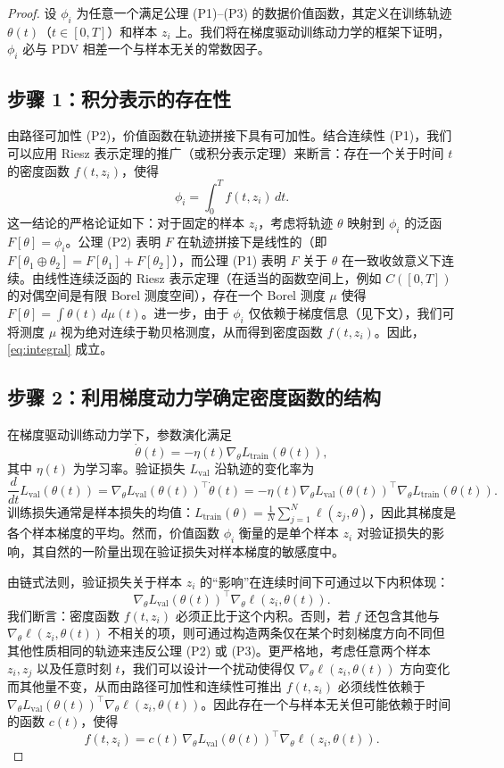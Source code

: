 \begin{proof}
设 $\phi_i$ 为任意一个满足公理 (P1)--(P3) 的数据价值函数，其定义在训练轨迹 $\theta(t)$（$t\in[0,T]$）和样本 $z_i$ 上。我们将在梯度驱动训练动力学的框架下证明，$\phi_i$ 必与 PDV 相差一个与样本无关的常数因子。

\subsection*{步骤 1：积分表示的存在性}
由路径可加性 (P2)，价值函数在轨迹拼接下具有可加性。结合连续性 (P1)，我们可以应用 Riesz 表示定理的推广（或积分表示定理）来断言：存在一个关于时间 $t$ 的密度函数 $f(t,z_i)$，使得
\begin{equation}
\phi_i = \int_0^T f(t, z_i) \, dt.
\label{eq:integral}
\end{equation}
这一结论的严格论证如下：对于固定的样本 $z_i$，考虑将轨迹 $\theta$ 映射到 $\phi_i$ 的泛函 $F[\theta] = \phi_i$。公理 (P2) 表明 $F$ 在轨迹拼接下是线性的（即 $F[\theta_1 \oplus \theta_2] = F[\theta_1] + F[\theta_2]$），而公理 (P1) 表明 $F$ 关于 $\theta$ 在一致收敛意义下连续。由线性连续泛函的 Riesz 表示定理（在适当的函数空间上，例如 $C([0,T])$ 的对偶空间是有限 Borel 测度空间），存在一个 Borel 测度 $\mu$ 使得 $F[\theta] = \int \theta(t) \, d\mu(t)$。进一步，由于 $\phi_i$ 仅依赖于梯度信息（见下文），我们可将测度 $\mu$ 视为绝对连续于勒贝格测度，从而得到密度函数 $f(t,z_i)$。因此，\eqref{eq:integral} 成立。

\subsection*{步骤 2：利用梯度动力学确定密度函数的结构}
在梯度驱动训练动力学下，参数演化满足
\[
\dot{\theta}(t) = -\eta(t) \nabla_\theta L_{\text{train}}(\theta(t)),
\]
其中 $\eta(t)$ 为学习率。验证损失 $L_{\text{val}}$ 沿轨迹的变化率为
\[
\frac{d}{dt} L_{\text{val}}(\theta(t)) = \nabla_\theta L_{\text{val}}(\theta(t))^\top \dot{\theta}(t)
= -\eta(t) \nabla_\theta L_{\text{val}}(\theta(t))^\top \nabla_\theta L_{\text{train}}(\theta(t)).
\]
训练损失通常是样本损失的均值：$L_{\text{train}}(\theta) = \frac{1}{N} \sum_{j=1}^N \ell(z_j,\theta)$，因此其梯度是各个样本梯度的平均。然而，价值函数 $\phi_i$ 衡量的是单个样本 $z_i$ 对验证损失的影响，其自然的一阶量出现在验证损失对样本梯度的敏感度中。

由链式法则，验证损失关于样本 $z_i$ 的“影响”在连续时间下可通过以下内积体现：
\[
\nabla_\theta L_{\text{val}}(\theta(t))^\top \nabla_\theta \ell(z_i, \theta(t)).
\]
我们断言：密度函数 $f(t,z_i)$ 必须正比于这个内积。否则，若 $f$ 还包含其他与 $\nabla_\theta \ell(z_i,\theta(t))$ 不相关的项，则可通过构造两条仅在某个时刻梯度方向不同但其他性质相同的轨迹来违反公理 (P2) 或 (P3)。更严格地，考虑任意两个样本 $z_i, z_j$ 以及任意时刻 $t$，我们可以设计一个扰动使得仅 $\nabla_\theta \ell(z_i,\theta(t))$ 方向变化而其他量不变，从而由路径可加性和连续性可推出 $f(t,z_i)$ 必须线性依赖于 $\nabla_\theta L_{\text{val}}(\theta(t))^\top \nabla_\theta \ell(z_i,\theta(t))$。因此存在一个与样本无关但可能依赖于时间的函数 $c(t)$，使得
\begin{equation}
f(t,z_i) = c(t) \, \nabla_\theta L_{\text{val}}(\theta(t))^\top \nabla_\theta \ell(z_i, \theta(t)).
\label{eq:linear}
\end{equation}


\end{proof}
